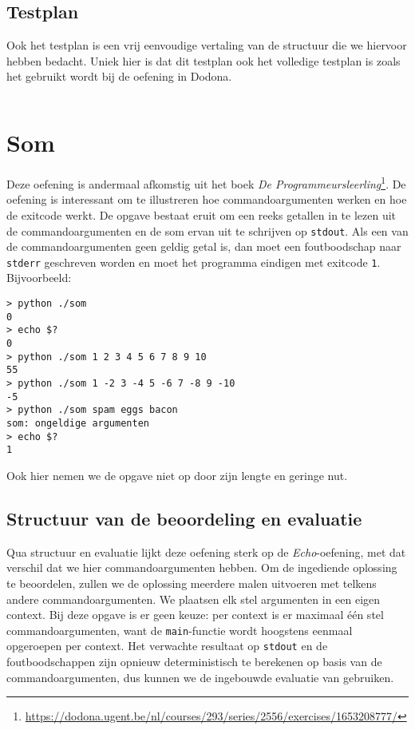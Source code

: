 \subsection{Testplan}\label{subsec:oefening-zero-testplan}

Ook het testplan is een vrij eenvoudige vertaling van de structuur die we hiervoor hebben bedacht.
Uniek hier is dat dit testplan ook het volledige testplan is zoals het gebruikt wordt bij de oefening in Dodona.

\inputminted{json}{sources/division-plan.tson}

\section{Som}\label{sec:oefeningen-som}

Deze oefening is andermaal afkomstig uit het boek \emph{De Programmeursleerling}\footnote{\url{https://dodona.ugent.be/nl/courses/293/series/2556/exercises/1653208777/}}.
De oefening is interessant om te illustreren hoe commandoargumenten werken en hoe de exitcode werkt.
De opgave bestaat eruit om een reeks getallen in te lezen uit de commandoargumenten en de som ervan uit te schrijven op \texttt{stdout}.
Als een van de commandoargumenten geen geldig getal is, dan moet een foutboodschap naar \texttt{stderr} geschreven worden en moet het programma eindigen met exitcode \texttt{1}.
Bijvoorbeeld:

\begin{verbatim}
> python ./som
0
> echo $?
0
> python ./som 1 2 3 4 5 6 7 8 9 10
55
> python ./som 1 -2 3 -4 5 -6 7 -8 9 -10
-5
> python ./som spam eggs bacon
som: ongeldige argumenten
> echo $?
1
\end{verbatim}

Ook hier nemen we de opgave niet op door zijn lengte en geringe nut.

\subsection{Structuur van de beoordeling en evaluatie}\label{subsec:oefening-som-structuur}

Qua structuur en evaluatie lijkt deze oefening sterk op de \emph{Echo}-oefening, met dat verschil dat we hier commandoargumenten hebben.
Om de ingediende oplossing te beoordelen, zullen we de oplossing meerdere malen uitvoeren met telkens andere commandoargumenten.
We plaatsen elk stel argumenten in een eigen context.
Bij deze opgave is er geen keuze: per context is er maximaal één stel commandoargumenten, want de \texttt{main}-functie wordt hoogstens eenmaal opgeroepen per context.
Het verwachte resultaat op \texttt{stdout} en de foutboodschappen zijn opnieuw deterministisch te berekenen op basis van de commandoargumenten, dus kunnen we de ingebouwde evaluatie van \tested{} gebruiken.

